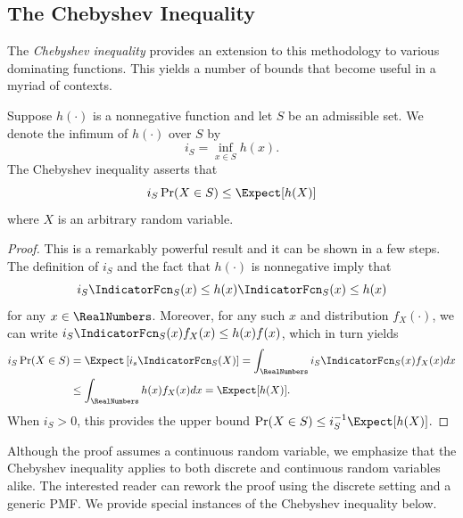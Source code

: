 \subsection{The Chebyshev Inequality}

The \emph{Chebyshev inequality} provides an extension to this methodology to various dominating functions. 
This yields a number of bounds that become useful in a myriad of contexts.

\begin{proposition}
Suppose $h (\cdot)$ is a nonnegative function and let $S$ be an admissible set.
We denote the infimum of $h (\cdot)$ over $S$ by
\begin{equation*}
i_S = \inf_{ x \in S } h (x) .
\end{equation*}
The Chebyshev inequality asserts that
\begin{equation} \label{equation:ChebyshevInequality}
i_S \Pr (X \in S)
\leq \Expect [ h(X) ]
\end{equation}
where $X$ is an arbitrary random variable.
\end{proposition}
\begin{proof}
This is a remarkably powerful result and it can be shown in a few steps.
The definition of $i_S$ and the fact that $h (\cdot)$ is nonnegative imply that
\begin{equation*}
i_S \IndicatorFcn_S (x) \leq h(x) \IndicatorFcn_S (x) \leq h(x)
\end{equation*}
for any $x \in \RealNumbers$.
Moreover, for any such $x$ and distribution $f_X(\cdot)$, we can write $i_S \IndicatorFcn_S (x) f_X(x) \leq h(x) f(x)$, which in turn yields
\begin{equation*}
\begin{split}
i_S \Pr (X \in S) &= \Expect \left[ i_s \IndicatorFcn_S (X) \right]
= \int_{\RealNumbers} i_S \IndicatorFcn_S (x) f_X(x) dx \\
&\leq \int_{\RealNumbers} h (x) f_X(x) dx
= \Expect [ h(X) ] .
\end{split}
\end{equation*}
When $i_S > 0$, this provides the upper bound $\Pr (X \in S) \leq i_S^{-1} \Expect [h (X)]$.
\end{proof}

Although the proof assumes a continuous random variable, we emphasize that the Chebyshev inequality applies to both discrete and continuous random variables alike.
The interested reader can rework the proof using the discrete setting and a generic PMF.
We provide special instances of the Chebyshev inequality below.

